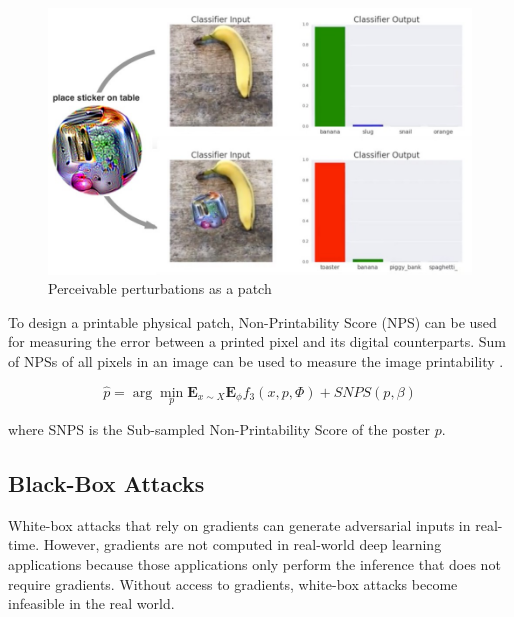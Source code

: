 \begin{figure}[H]
\centering
\includegraphics[scale=0.5]{figures/chapter_intro/adv_patch.jpg}
\caption{Perceivable perturbations as a patch}
\label{fig.adv_patch}
\end{figure}




To design a printable physical patch, Non-Printability Score (NPS) can be used for measuring the error between a printed pixel and its digital counterparts. Sum of NPSs of all pixels in an image can be used to measure the image printability \citep{wang2021daedalus}.

$$\hat{p} = \arg \underset{p}{\min}\mathbf{E}_{x \sim X}\mathbf{E}_\phi f_3(x, p, \Phi) + SNPS(p, \beta)$$

where SNPS is the Sub-sampled Non-Printability Score of the poster $p$.


\subsection{Black-Box Attacks}
\label{sec:blackbox_attack}

White-box attacks that rely on gradients can generate adversarial inputs in real-time. However, gradients are not computed in real-world deep learning applications because those applications only perform the inference that does not require gradients. Without access to gradients, white-box attacks become infeasible in the real world.

